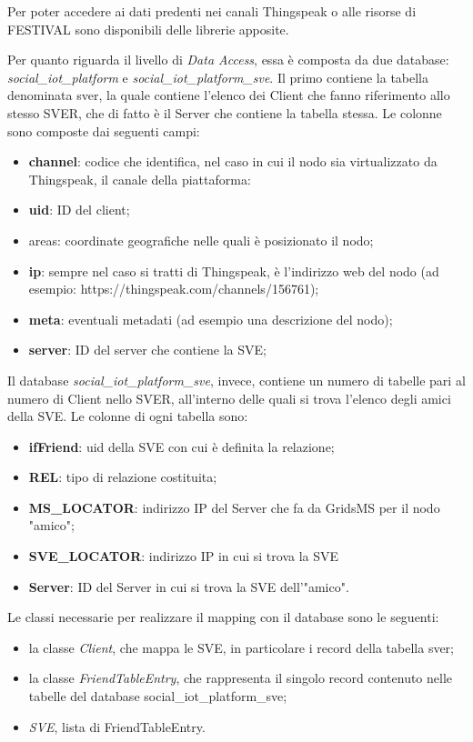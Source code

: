Per poter accedere ai dati predenti nei canali Thingspeak o alle risorse di FESTIVAL sono disponibili delle librerie apposite.

Per quanto riguarda il livello di \textit{Data Access}, essa è composta da due database: \textit{social\_iot\_platform} e \textit{social\_iot\_platform\_sve}. Il primo contiene la tabella denominata sver, la quale contiene l'elenco dei Client che fanno riferimento allo stesso SVER, che di fatto è il Server che contiene la tabella stessa. Le colonne sono composte dai seguenti campi:

\begin{itemize}
    \item \textbf{channel}: codice che identifica, nel caso in cui il nodo sia virtualizzato da Thingspeak, il canale della piattaforma:
    \item \textbf{uid}: ID del client;
    \item areas: coordinate geografiche nelle quali è posizionato il nodo;
    \item \textbf{ip}: sempre nel caso si tratti di Thingspeak, è l'indirizzo web del nodo (ad esempio: https://thingspeak.com/channels/156761);
    \item \textbf{meta}: eventuali metadati (ad esempio una descrizione del nodo);
    \item \textbf{server}: ID del server che contiene la SVE;
\end{itemize}

Il database \textit{social\_iot\_platform\_sve}, invece, contiene un numero di tabelle pari al numero di Client nello SVER, all'interno delle quali si trova l'elenco degli amici della SVE. Le colonne di ogni tabella sono:

\begin{itemize}
    \item \textbf{ifFriend}: uid della SVE con cui è definita la relazione;
    \item \textbf{REL}: tipo di relazione costituita;
    \item \textbf{MS\_LOCATOR}: indirizzo IP del Server che fa da GridsMS per il nodo "amico"; 
    \item \textbf{SVE\_LOCATOR}: indirizzo IP in cui si trova la SVE 
    \item \textbf{Server}: ID del Server in cui si trova la SVE dell'"amico".
\end{itemize}

Le classi necessarie per realizzare il mapping con il database sono le seguenti: 
\begin{itemize}
    \item la classe \textit{Client}, che mappa le SVE, in particolare i record della tabella sver;
    \item la classe \textit{FriendTableEntry}, che rappresenta il singolo record contenuto nelle tabelle del database social\_iot\_platform\_sve;
    \item \textit{SVE}, lista di FriendTableEntry.
\end{itemize}

